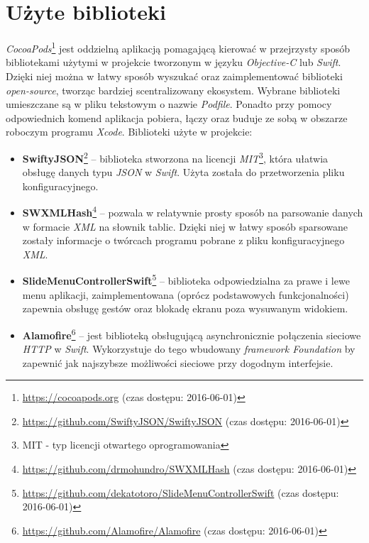 \documentclass{iiuwb}
\begin{document}
\section{Użyte biblioteki}
\textit{CocoaPods}\footnote{\url{https://cocoapods.org} (czas dostępu: 2016-06-01)} jest oddzielną aplikacją pomagającą kierować w przejrzysty sposób bibliotekami użytymi w projekcie tworzonym w języku \textit{Objective-C} lub \textit{Swift}. Dzięki niej można w łatwy sposób wyszukać oraz zaimplementować biblioteki \textit{open-source}, tworząc bardziej scentralizowany ekosystem. Wybrane biblioteki umieszczane są w pliku tekstowym o nazwie \textit{Podfile}. Ponadto przy pomocy odpowiednich komend aplikacja pobiera, łączy oraz buduje ze sobą w obszarze roboczym programu \textit{Xcode}. Biblioteki użyte w projekcie:
\begin{itemize}
\item \textbf{SwiftyJSON}\footnote{\url{https://github.com/SwiftyJSON/SwiftyJSON} (czas dostępu: 2016-06-01)} -- biblioteka stworzona na licencji \textit{MIT}\footnote{MIT - typ licencji otwartego oprogramowania}, która ułatwia obsługę danych typu \textit{JSON} w \textit{Swift}. Użyta została do przetworzenia pliku konfiguracyjnego.
\item \textbf{SWXMLHash}\footnote{\url{https://github.com/drmohundro/SWXMLHash} (czas dostępu: 2016-06-01)} -- pozwala w relatywnie prosty sposób na parsowanie danych w formacie \textit{XML} na słownik tablic. Dzięki niej w łatwy sposób sparsowane zostały informacje o twórcach programu pobrane z pliku konfiguracyjnego \textit{XML}.
\end{itemize}
\newpage
\begin{itemize}
\item \textbf{SlideMenuControllerSwift}\footnote{\url{https://github.com/dekatotoro/SlideMenuControllerSwift} (czas dostępu: 2016-06-01)} -- biblioteka odpowiedzialna za prawe i lewe menu aplikacji, zaimplementowana (oprócz podstawowych funkcjonalności) zapewnia obsługę gestów oraz blokadę ekranu poza wysuwanym widokiem.
\item \textbf{Alamofire}\footnote{\url{https://github.com/Alamofire/Alamofire} (czas dostępu: 2016-06-01)} -- jest biblioteką obsługującą asynchronicznie połączenia sieciowe \textit{HTTP} w \textit{Swift}. Wykorzystuje do tego wbudowany \textit{framework Foundation} by zapewnić jak najszybsze możliwości sieciowe przy dogodnym interfejsie.
\end{itemize}
\end{document}
